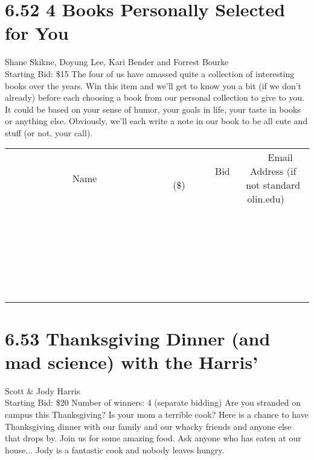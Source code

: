 \documentclass[11pt]{article}
\begin{document}
\section*{6.52 4 Books Personally Selected for You}
Shane Skikne, Doyung Lee, Kari Bender and Forrest Bourke
\\
Starting Bid: \$15
\newline
The four of us have amassed quite a collection of interesting books over the years. Win this item and we'll get to know you a bit (if we don't already) before each choosing a book from our personal collection to give to you. It could be based on your sense of humor, your goals in life, your taste in books or anything else.  Obviously, we'll each write a note in our book to be all cute and stuff (or not, your call).
\\[6ex]
\begin{tabular}{c c c}
~~~~~~~~~~~~~Name~~~~~~~~~~~~~ & ~~~~~~~~~Bid (\$)~~~~~~~~~  & ~~~Email Address (if not standard olin.edu)~~~\\
 & & \\
\hline
 & & \\
\hline
 & & \\
\hline
 & & \\
\hline
 & & \\
\hline
 & & \\
\hline
 & & \\
\hline
 & & \\
\hline
 & & \\
\hline
 & & \\
\hline
 & & \\
\hline
 & & \\
\hline
 & & \\
\hline
 & & \\
\hline
 & & \\
\hline
 & & \\
\hline
 & & \\
\hline
 & & \\
\hline
 & & \\
\hline
 & & \\
\hline
 & & \\
\hline
 & & \\
\hline
 & & \\
\hline
 & & \\
\hline
 & & \\
\hline
 & & \\
\hline
\end{tabular}
\newpage
\section*{6.53 Thanksgiving Dinner (and mad science) with the Harris'}
Scott \& Jody Harris
\\
Starting Bid: \$20
\newline
Number of winners: 4 (separate bidding)
\newline
Are you stranded on campus this Thanksgiving? Is your mom a terrible cook? Here is a chance to have Thanksgiving dinner with our family and our whacky friends and anyone else that drops by. Join us for some amazing food. Ask anyone who has eaten at our house... Jody is a fantastic cook and nobody leaves hungry.
\end{document}
